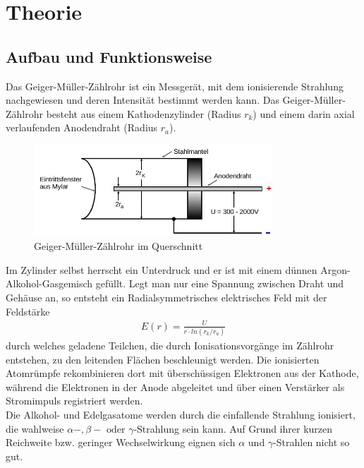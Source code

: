 
\section{Theorie}
\subsection{Aufbau und Funktionsweise}
Das Geiger-Müller-Zählrohr ist ein Messgerät, mit dem ionisierende Strahlung nachgewiesen und deren Intensität bestimmt werden kann. Das Geiger-Müller-Zählrohr besteht aus einem Kathodenzylinder (Radius $r_k$) und einem darin axial verlaufenden Anodendraht (Radius $r_a$). 
\begin{figure}[htbp]
	\includegraphics[width=0.8\textwidth]{pics/zaehlrohr.jpg}
	\caption{Geiger-Müller-Zählrohr im Querschnitt}
\end{figure}
Im Zylinder selbst herrscht ein Unterdruck und er ist mit einem dünnen Argon-Alkohol-Gasgemisch gefüllt. Legt man nur eine Spannung zwischen Draht und Gehäuse an, so entsteht ein Radialsymmetrisches elektrisches Feld mit der Feldstärke
\begin{align}
	E(r)= \frac{U}{r\cdot ln (r_k / r_a)}
\end{align}
durch welches geladene Teilchen, die durch Ionisationsvorgänge im Zählrohr entstehen, zu den leitenden Flächen beschleunigt werden. Die ionisierten Atomrümpfe rekombinieren dort mit überschüssigen Elektronen aus der Kathode, während die Elektronen in der Anode abgeleitet und über einen Verstärker als Stromimpuls registriert werden.\\

Die Alkohol- und Edelgasatome werden durch die einfallende Strahlung ionisiert, die wahlweise $\alpha-, \beta- \text{ oder } \gamma$-Strahlung sein kann. Auf Grund ihrer kurzen Reichweite bzw. geringer Wechselwirkung eignen sich $\alpha \text{ und } \gamma$-Strahlen nicht so gut.

